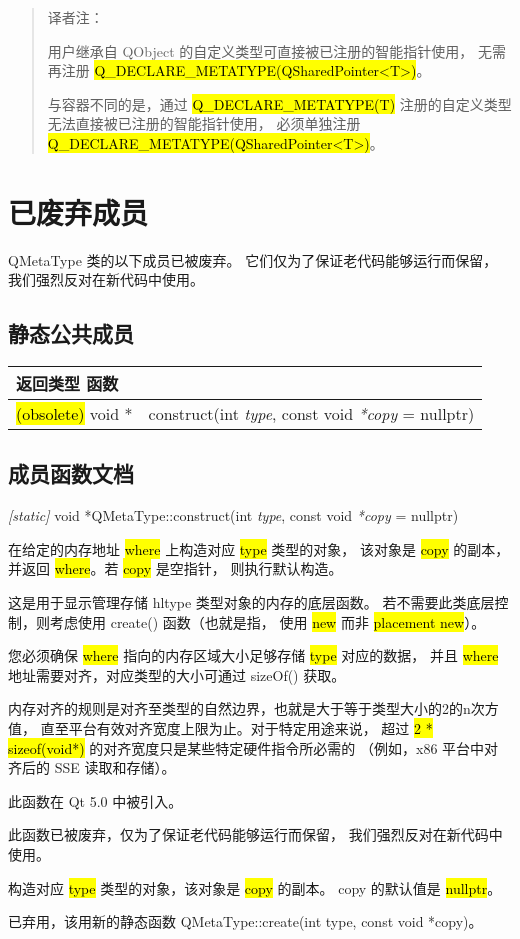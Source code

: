 \begin{quote}
译者注：

用户继承自 QObject 的自定义类型可直接被已注册的智能指针使用，
无需再注册 \hl{Q\_DECLARE\_METATYPE(QSharedPointer<T>)}。

与容器不同的是，通过 \hl{Q\_DECLARE\_METATYPE(T)} 
注册的自定义类型无法直接被已注册的智能指针使用，
必须单独注册 \hl{Q\_DECLARE\_METATYPE(QSharedPointer<T>)}。
\end{quote}

\section{已废弃成员}

QMetaType 类的以下成员已被废弃。
它们仅为了保证老代码能够运行而保留，
我们强烈反对在新代码中使用。

\subsection{静态公共成员}

\begin{tabular}{|l|l|}
\hline
返回类型 	函数 \\
\hline
\hl{(obsolete)} void * 	& construct(int \emph{type}, const void \emph{*copy} = nullptr) \\
\end{tabular}

\subsection{成员函数文档}

\emph{[static]} void *QMetaType::construct(int \emph{type}, const void \emph{*copy} = nullptr)

在给定的内存地址 \hl{where} 上构造对应 \hl{type} 类型的对象，
该对象是 \hl{copy} 的副本，并返回 \hl{where}。若 \hl{copy} 是空指针，
则执行默认构造。

这是用于显示管理存储 hl{type} 类型对象的内存的底层函数。
若不需要此类底层控制，则考虑使用 create() 函数（也就是指，
使用 \hl{new} 而非 \hl{placement new}）。

您必须确保 \hl{where} 指向的内存区域大小足够存储 \hl{type} 对应的数据，
并且 \hl{where} 地址需要对齐，对应类型的大小可通过 sizeOf() 获取。

内存对齐的规则是对齐至类型的自然边界，也就是大于等于类型大小的2的n次方值，
直至平台有效对齐宽度上限为止。对于特定用途来说，
超过 \hl{2 * sizeof(void*)} 的对齐宽度只是某些特定硬件指令所必需的
（例如，x86 平台中对齐后的 SSE 读取和存储）。

此函数在 Qt 5.0 中被引入。

此函数已被废弃，仅为了保证老代码能够运行而保留，
我们强烈反对在新代码中使用。

构造对应 \hl{type} 类型的对象，该对象是 \hl{copy} 的副本。
copy 的默认值是 \hl{nullptr}。

已弃用，该用新的静态函数 QMetaType::create(int type, const void *copy)。